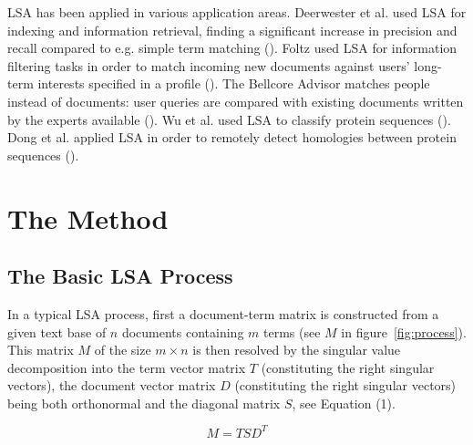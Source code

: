 \documentclass[article]{jss}
\begin{document}
LSA has been applied in various application areas. Deerwester et al. 
used LSA for indexing and information retrieval, finding a significant increase 
in precision and recall compared to e.g. simple term matching (\cite{landauer:1990}). 
Foltz used LSA for information filtering tasks 
in order to match incoming new documents against users' long-term interests 
specified in a profile (\cite{foltz:1990}). The Bellcore Advisor matches people 
instead of documents: user queries are compared with existing documents 
written by the experts available (\cite{furnas:1988}). Wu et al. used LSA
to classify protein sequences (\cite{wu:1995}). Dong et al. applied LSA in order to
remotely detect homologies between protein sequences (\cite{dong:2006}).

  
\section[method]{The Method}


\subsection{The Basic LSA Process}

In a typical LSA process, first a document-term matrix is constructed 
from a given text base of \begin{math}n\end{math} documents containing 
\begin{math}m\end{math} terms (see \begin{math}M\end{math} in figure~\ref{fig:process}). 
This matrix \begin{math}M\end{math} of the size \begin{math}m \times n\end{math} 
is then resolved by the singular value decomposition into the term vector 
matrix \begin{math}T\end{math} (constituting the right singular vectors), 
the document vector matrix \begin{math}D\end{math} (constituting the right 
singular vectors) being both orthonormal and the diagonal matrix 
\begin{math}S\end{math}, see Equation (1). 

\begin{equation}M = TSD^T\end{equation}
\end{document}
